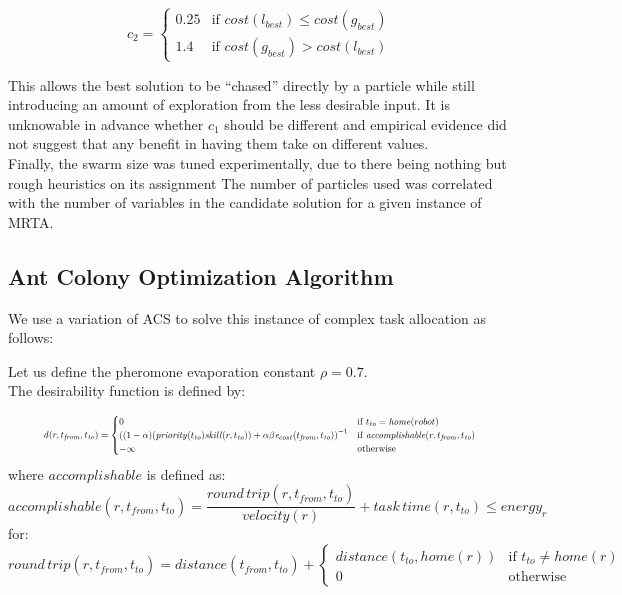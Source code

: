 \documentclass[a4paper]{article}
\begin{document}
$$
c_2 =
\begin{cases}
0.25 & \text{if } \mathit{cost}(l_\mathit{best}) \leq \mathit{cost}(g_\mathit{best})\\
1.4 & \text{if } \mathit{cost}(g_\mathit{best}) > \mathit{cost}(l_\mathit{best})
\end{cases}
$$

This allows the best solution to be ``chased'' directly by a particle while still introducing an amount of exploration from the less desirable input. It is unknowable in advance whether $c_1$ should be different and empirical evidence did not suggest that any benefit in having them take on different values. \cite{PermutationPSO}\\

Finally, the swarm size was tuned experimentally, due to there being nothing but rough heuristics on its assignment The number of particles used was correlated with the number of variables in the candidate solution for a given instance of MRTA. \cite{PermutationPSO}

\subsection{Ant Colony Optimization Algorithm} %

We use a variation of ACS to solve this instance of complex task allocation as follows:

Let us define the pheromone evaporation constant $\rho=0.7$.\\
The desirability function is defined by:

\begin{equation*}
\resizebox{0.9\textwidth}{!}{$
\mathit{d}(r, t_\mathit{from}, t_\mathit{to}) = \begin{cases}
  0 & \text{if } t_\mathit{to} = \mathit{home}(robot) \\
  \left(
  (1 - \alpha)
    (\mathit{priority}(t_\mathit{to}) \mathit{skill}(r, t_\mathit{to})) +
    \alpha \beta
    \mathit{e}_{cost}(t_\mathit{from}, t_\mathit{to})
  \right)^{-1}
  & \text{if }\mathit{accomplishable}(r, t_\mathit{from}, t_\mathit{to}) \\
  - \infty
  & \text{otherwise} \\
\end{cases}
$}
\end{equation*}
where $\mathit{accomplishable}$ is defined as:
$$
\mathit{accomplishable}(r, t_\mathit{from}, t_\mathit{to}) =
\frac{\mathit{round\,trip}(r, t_\mathit{from}, t_\mathit{to})}{velocity(r)} + \mathit{task \, time}(r, t_\mathit{to}) \leq \mathit{energy}_r
$$
for:
$$
\mathit{round\,trip}(r, t_\mathit{from}, t_\mathit{to}) = \mathit{distance}(t_\mathit{from}, t_\mathit{to}) + \begin{cases}
\mathit{distance}(t_\mathit{to}, \mathit{home}(r)) & \text{if } t_\mathit{to} \ne \mathit{home}(r) \\
0 & \text{otherwise}
\end{cases}
$$
\end{document}
